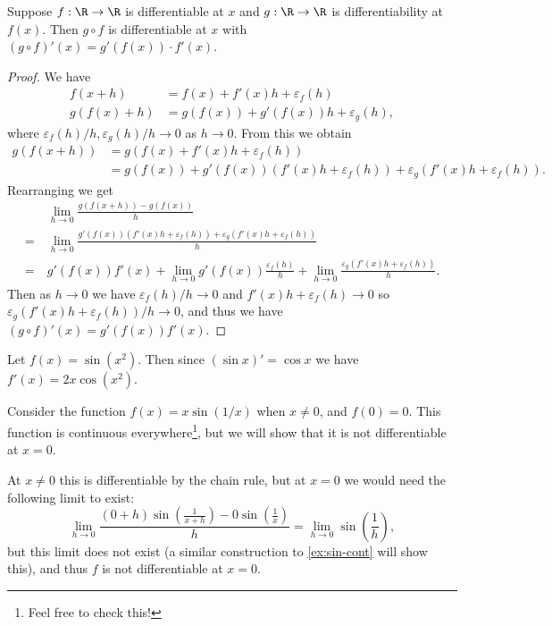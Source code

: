 \begin{proposition}
	Suppose $f: \R \rightarrow \R$ is differentiable at $x$ and $g: \R \rightarrow \R$ is differentiability at $f(x)$. Then $g \circ f$ is differentiable at $x$ with $(g \circ f)'(x) = g'(f(x)) \cdot f'(x)$.
\end{proposition}
\begin{proof}
	We have
	\begin{align*}
	f(x + h) &= f(x) + f'(x)h + \varepsilon_f(h) \\
		g(f(x) + h) &= g(f(x)) + g'(f(x)) h + \varepsilon_g(h),
	\end{align*}
	where $\varepsilon_f(h)/h, \varepsilon_g(h)/h \rightarrow 0$ as $h \rightarrow 0$. From this we obtain
	\begin{align*}
		g(f(x + h)) &= g(f(x) + f'(x)h + \varepsilon_f(h)) \\
		&= g(f(x)) + g'(f(x))(f'(x)h + \varepsilon_f(h)) + \varepsilon_g(f'(x)h + \varepsilon_f(h)).
	\end{align*}
	Rearranging we get
	\begin{align*}
		&\lim_{h \to 0}\frac{g(f(x + h)) - g(f(x))}{h}\\
		=\ &\lim_{h \to 0} \frac{g'(f(x))(f'(x)h + \varepsilon_f(h)) + \varepsilon_g(f'(x)h + \varepsilon_f(h))}{h} \\
		=\ &g'(f(x))f'(x) +  \lim_{h \to 0}g'(f(x)) \frac{\varepsilon_f(h)}{h} +\lim_{h \to 0}\frac{\varepsilon_g(f'(x)h + \varepsilon_f(h))}{h}.
	\end{align*}
	Then as $h \rightarrow 0$ we have $\varepsilon_f (h)/h \rightarrow 0$ and $f'(x)h + \varepsilon_f(h) \rightarrow 0$ so $\varepsilon_g(f'(x)h + \varepsilon_f(h))/h \rightarrow 0$, and thus we have
	$
	(g \circ f)'(x) = g'(f(x))f'(x).
	$
\end{proof}



\begin{example}
	Let $f(x) = \sin(x^2)$. Then since $(\sin x)' = \cos x$ we have $f'(x) = 2x \cos (x^2)$.
\end{example}
\begin{example}
	Consider the function $f(x) = x \sin(1/x)$ when $x \neq 0$, and $f(0) = 0$. This function is continuous everywhere\footnote{Feel free to check this!}, but we will show that it is not differentiable at $x = 0$.

	At $x \neq 0$ this is differentiable by the chain rule, but at $x = 0$ we would need the following limit to exist:
	$$
	\lim_{h \to 0} \frac{(0 + h)\sin\left(\frac{1}{x + h}\right) - 0\sin\left(\frac{1}{x}\right)}{h} = \lim_{h \to 0} \sin\left(\frac{1}{h}\right),
	$$
	but this limit does not exist (a similar construction to \autoref{ex:sin-cont} will show this), and thus $f$ is not differentiable at $x = 0$.
\end{example}

